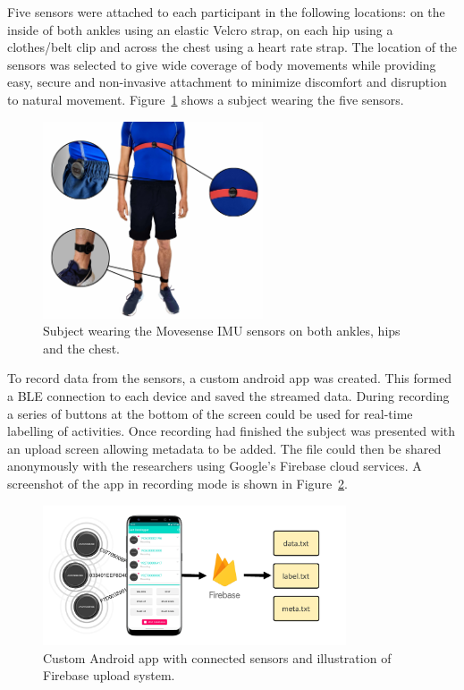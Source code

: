 Five sensors were attached to each participant in the following locations: on the inside of both ankles using an elastic Velcro strap, on each hip using a clothes/belt clip and across the chest using a heart rate strap. The location of the sensors was selected to give wide coverage of body movements while providing easy, secure and non-invasive attachment to minimize discomfort and disruption to natural movement. Figure~\ref{fig:movesense_sensors} shows a subject wearing the five sensors.

\begin{figure}[!hbt]
    \centering
    \includegraphics[height=220px]{content/4-LSTM_Behaviour/sensor_locations.jpg}
    \caption[Subject wearing the Movesense IMU sensors]{Subject wearing the Movesense IMU sensors on both ankles, hips and the chest.}
    \label{fig:movesense_sensors}
\end{figure}

To record data from the sensors, a custom android app was created. This formed a BLE connection to each device and saved the streamed data. During recording a series of buttons at the bottom of the screen could be used for real-time labelling of activities. Once recording had finished the subject was presented with an upload screen allowing metadata to be added. The file could then be shared anonymously with the researchers using Google's Firebase cloud services. A screenshot of the app in recording mode is shown in Figure~\ref{fig:data_collection_diagrams}.

\begin{figure}[!hbt]
    \centering
    \includegraphics[width=0.8\textwidth]{content/4-LSTM_Behaviour/sensor_collection.pdf}
    \caption[Custom Android app with connected sensors]{Custom Android app with connected sensors and illustration of Firebase upload system.}
    \label{fig:data_collection_diagrams}
\end{figure}

